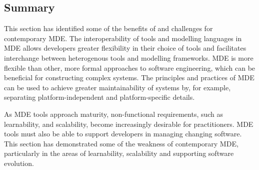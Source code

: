 \subsection{Summary}
This section has identified some of the benefits of and challenges for contemporary MDE. The interoperability of tools and modelling languages in MDE allows developers greater flexibility in their choice of tools and facilitates interchange between heterogenous tools and modelling frameworks. MDE is more flexible than other, more formal approaches to software engineering, which can be beneficial for constructing complex systems. The principles and practices of MDE can be used to achieve greater maintainability of systems by, for example, separating platform-independent and platform-specific details.

As MDE tools approach maturity, non-functional requirements, such as learnability, and scalability, become increasingly desirable for practitioners. MDE tools must also be able to support developers in managing changing software. This section has demonstrated some of the weakness of contemporary MDE, particularly in the areas of learnability, scalability and supporting software evolution.